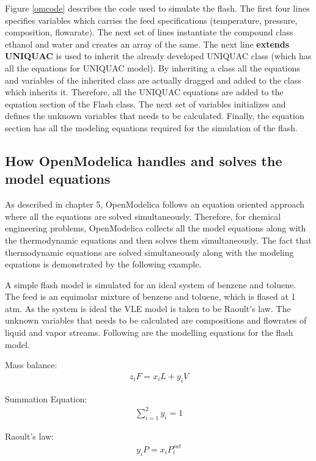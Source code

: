 \documentclass[12pt]{report}
\begin{document}
Figure \ref{omcode} describes the code used to simulate the flash. The first four lines specifies variables which carries the feed specifications (temperature, pressure, composition, flowarate). The next set of lines instantiate the compound class ethanol and water and creates an array of the same. The next line \textbf{extends UNIQUAC} is used to inherit the already developed UNIQUAC class (which has all the equations for UNIQUAC model). By inheriting a class all the equations and variables of the inherited class are actually dragged and added to the class which inherits it. Therefore, all the UNIQUAC equations are added to the equation section of the Flash class. The next set of variables initializes and defines the unknown variables that needs to be calculated. Finally, the equation section has all the modeling equations required for the simulation of the flash. 

\subsection{How OpenModelica handles and solves the model equations}
As described in chapter 5, OpenModelica follows an equation oriented approach where all the equations are solved simultaneously. Therefore, for chemical engineering problems, OpenModelica collects all the model equations along with the thermodynamic equations and then solves them simultaneously. The fact that thermodynamic equations are solved simultaneously along with the modeling equations is demonstrated by the following example.

A simple flash model is simulated for an ideal system of benzene and toluene. The feed is an equimolar mixture of benzene and toluene, which is flased at 1 atm. As the system is ideal the VLE model is taken to be Raoult's law. The unknown variables that needs to be calculated are compositions and flowrates of liquid and vapor streams. Following are the modelling equations for the flash model.


Mass balance: \\
\begin{gather}
z_iF = x_iL + y_iV 
\label{massbal}
\end{gather}

Summation Equation: \\
\begin{gather}
\sum_{i=1}^2y_i = 1 
\label{summeqn}
\end{gather}   

Raoult's law: \\
\begin{gather}
y_iP = x_iP_i^{sat}
\label{rlaw}
\end{gather}  
\end{document}
